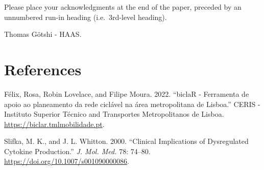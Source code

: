 \documentclass[runningheads]{llncs}
\newlength{\cslhangindent}
\newlength{\cslentryspacingunit} %
\newenvironment{CSLReferences}[2] %
 {%
  \setlength{\parindent}{0pt}
  \ifodd #1
  \let\oldpar\par
  \def\par{\hangindent=\cslhangindent\oldpar}
  \fi
  \setlength{\parskip}{#2\cslentryspacingunit}
 }%
 {}
\begin{document}
Please place your acknowledgments at the end of the paper, preceded by
an unnumbered run-in heading (i.e.~3rd-level heading).

Thomas Götshi - HAAS.

\hypertarget{references}{%
\section*{References}\label{references}}

\hypertarget{refs}{}
\begin{CSLReferences}{1}{0}
\leavevmode{}%
Félix, Rosa, Robin Lovelace, and Filipe Moura. 2022. {``{biclaR -
Ferramenta de apoio ao planeamento da rede ciclável na área
metropolitana de Lisboa}.''} {CERIS - Instituto Superior Técnico and
Transportes Metropolitanos de Lisboa}.
\url{https://biclar.tmlmobilidade.pt}.

\leavevmode{}%
Slifka, M. K., and J. L. Whitton. 2000. {``Clinical Implications of
Dysregulated Cytokine Production.''} \emph{J. {M}ol. {M}ed.} 78: 74--80.
\url{https://doi.org/10.1007/s001090000086}.

\end{CSLReferences}

%
\end{document}
